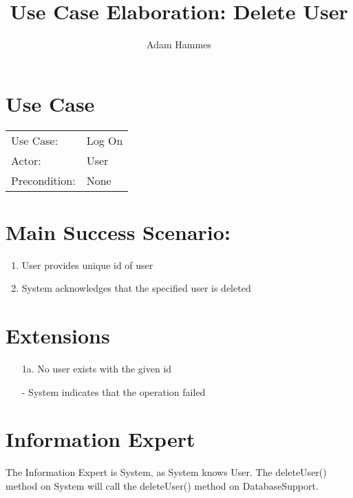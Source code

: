 \documentclass{article}
\title{Use Case Elaboration: Delete User}
\author{ Adam Hammes }
\begin{document}
\maketitle


\section*{Use Case}
\begin{tabular}{l l}
Use Case:     & Log On\\
Actor:        & User\\
Precondition: & None\\
\end{tabular}


\section*{Main Success Scenario:}

\begin{enumerate}
    \item User provides unique id of user
    \item System acknowledges that the specified user is deleted

\end{enumerate}

\section*{Extensions}

\begin{itemize}
    \item [1a.] No user exists with the given id
                
    - System indicates that the operation failed

\end{itemize}


\section*{Information Expert}

The Information Expert is System, as System knows User.
The deleteUser() method on System will call the deleteUser() method on DatabaseSupport.
\end{document}
